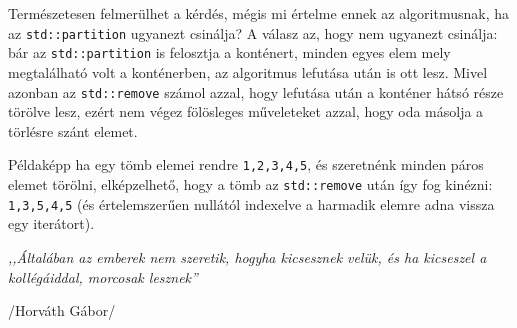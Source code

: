 \documentclass[a4paper,11.5pt,table]{article}
\begin{document}
	\medskip
	Természetesen felmerülhet a kérdés, mégis mi értelme ennek az algoritmusnak, ha az \texttt{std::partition} ugyanezt csinálja? A válasz az, hogy nem ugyanezt csinálja: bár az \texttt{std::partition} is felosztja a konténert, minden egyes elem mely megtalálható volt a konténerben, az algoritmus lefutása után is ott lesz. Mivel azonban az \texttt{std::remove} számol azzal, hogy lefutása után a konténer hátsó része törölve lesz, ezért nem végez fölösleges műveleteket azzal, hogy oda másolja a törlésre szánt elemet.
	
	Példaképp ha egy tömb elemei rendre \texttt{1,2,3,4,5}, és szeretnénk minden páros elemet törölni, elképzelhető, hogy a tömb az \texttt{std::remove} után így fog kinézni: \texttt{1,3,5,4,5} (és értelemszerűen nullától indexelve a harmadik elemre adna vissza egy iterátort).
	\begin{center}
		\textit{,,Általában az emberek nem szeretik, hogyha kicsesznek velük, és ha kicseszel a kollégáiddal, morcosak lesznek''}
		
		/Horváth Gábor/
	\end{center}
\end{document}
